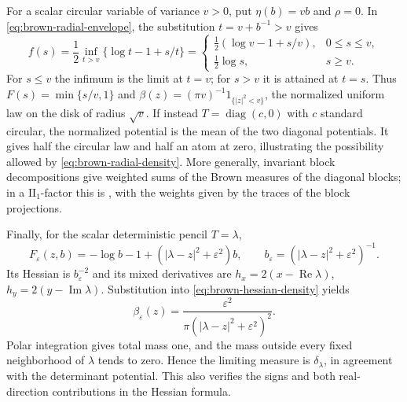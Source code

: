 For a scalar circular variable of variance $v>0$, put $\eta(b)=vb$ and $\rho=0$.
In \eqref{eq:brown-radial-envelope}, the substitution $t=v+b^{-1}>v$ gives
\[
 f(s)=\frac12\inf_{t>v}\{\log t-1+s/t\}
 =\begin{cases}
   \tfrac12(\log v-1+s/v),&0\le s\le v,\\
   \tfrac12\log s,&s\ge v.
  \end{cases}
\]
For $s\le v$ the infimum is the limit at $t=v$; for $s>v$ it is attained at $t=s$.
Thus $F(s)=\min\{s/v,1\}$ and $\beta(z)=(\pi v)^{-1}1_{\{|z|^2<v\}}$, the normalized uniform law on the disk of radius $\sqrt v$.
If instead $T=\operatorname{diag}(c,0)$ with $c$ standard circular, the normalized potential is the mean of the two diagonal potentials.
It gives half the circular law and half an atom at zero, illustrating the possibility allowed by \eqref{eq:brown-radial-density}.
More generally, invariant block decompositions give weighted sums of the Brown measures of the diagonal blocks; in a $\mathrm{II}_1$-factor this is \cite[Proposition~6.5]{HS09}, with the weights given by the traces of the block projections.

Finally, for the scalar deterministic pencil $T=\lambda$,
\[
 F_\varepsilon(z,b)=-\log b-1+(|\lambda-z|^2+\varepsilon^2)b,
 \qquad b_\varepsilon=(|\lambda-z|^2+\varepsilon^2)^{-1}.
\]
Its Hessian is $b_\varepsilon^{-2}$ and its mixed derivatives are $h_x=2(x-\operatorname{Re}\lambda)$, $h_y=2(y-\operatorname{Im}\lambda)$.
Substitution into \eqref{eq:brown-hessian-density} yields
\[
 \beta_\varepsilon(z)=
 \frac{\varepsilon^2}{\pi(|\lambda-z|^2+\varepsilon^2)^2}.
\]
Polar integration gives total mass one, and the mass outside every fixed neighborhood of $\lambda$ tends to zero.
Hence the limiting measure is $\delta_\lambda$, in agreement with the determinant potential.
This also verifies the signs and both real-direction contributions in the Hessian formula.

